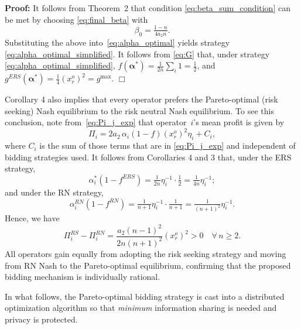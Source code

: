 \documentclass[journal]{IEEEtran}
\begin{document}
\noindent\textbf{Proof:} It follows from  Theorem~2 that condition \eqref{eq:beta_sum_condition} can be met by choosing \eqref{eq:final_beta} with   
\begin{equation}
\beta_0= \tfrac{1-n}{4a_2n}.  \label{eq:beta_optimal_simplified}
\end{equation}
Substituting the above into~\eqref{eq:alpha_optimal} yields strategy \eqref{eq:alpha_optimal_simplified}. It follows from \eqref{eq:G} that, under strategy \eqref{eq:alpha_optimal_simplified},
$f(\boldsymbol{\alpha}^*)=\tfrac{1}{2n}\sum_i 1=\tfrac{1}{2}$, and
$g^{ERS}(\boldsymbol{\alpha}^*)=\frac{1}{4}(x_r^o)^2=g^{\max}$. \hfill $\Box$

Corollary 4 also implies that every operator prefers the Pareto-optimal (risk seeking) Nash equilibrium to the risk neutral Nash equilibrium. To see this conclusion, note from~\eqref{eq:Pi_j_exp} that operator~$i$'s mean profit is given by 
\[ \Pi_i = 2a_2\,\alpha_i(1-f)(x_r^o)^2\eta_i + C_i, \]
where $C_i$ is the sum of those terms that are in \eqref{eq:Pi_j_exp} and independent of bidding strategies used. It follows from Corollaries 4 and 3 that, under the ERS strategy, 
\[ \alpha_i^*(1-f^{ERS}) = \tfrac{1}{2n}\eta_i^{-1}\cdot\tfrac{1}{2} = \tfrac{1}{4n}\eta_i^{-1}; \] 
and under the RN strategy, 
\[ \alpha_i^{RN}(1-f^{RN}) = \tfrac{1}{n+1}\eta_i^{-1}\cdot\tfrac{1}{n+1} = \tfrac{1}{(n+1)^2}\eta_i^{-1}.\] 
Hence, we have
\[
\Pi_i^{RS} - \Pi_i^{RN} = \frac{a_2(n-1)^2}{2n(n+1)^2} (x_r^o)^2 > 0 \quad \forall\, n \geq 2.
\]
All operators gain equally from adopting the risk seeking strategy and moving from RN Nash to the Pareto-optimal equilibrium, confirming that the proposed bidding mechanism is individually rational. 

In what follows, the Pareto-optimal bidding strategy is cast into a distributed optimization algorithm so that {\it minimum} information sharing is needed and privacy is protected.   
\end{document}

